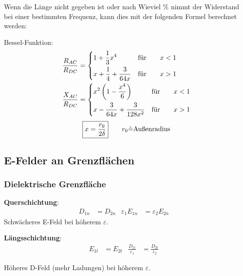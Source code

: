 Wenn die Länge nicht gegeben ist oder nach Wieviel \% nimmt der Widerstand bei
einer bestimmten Frequenz, kann dies mit der folgenden Formel berechnet werden:

\begin{description}
    \item Bessel-Funktion:
        \begin{align*}
            \frac{R_{AC}}{R_{DC}} & =
            \begin{dcases}
                1 + \frac{1}{3}x^4              & \text{für} \qquad x < 1 \\
                x + \frac{1}{4} + \frac{3}{64x} & \text{für} \qquad x > 1 \\
            \end{dcases} \\
            \frac{X_{AC}}{R_{DC}} & =
            \begin{dcases}
                x^2\left( 1-\frac{x^4}{6} \right)   & \text{für} \qquad x < 1 \\
                x- \frac{3}{64x} + \frac{3}{128x^2} & \text{für} \qquad x > 1 \\
            \end{dcases}
        \end{align*}
        \[
            \boxed{x=\frac{r_0}{2\delta}} \qquad r_0 \hat{=} \textnormal{Außenradius}
        \]
\end{description}


\subsection{E-Felder an Grenzflächen}
\subsubsection{Dielektrische Grenzfläche}
\textbf{Querschichtung}:
\begin{align*}
	D_{1n} & = D_{2n} & \varepsilon_1 E_{1n} & =\varepsilon_2 E_{2n} &
\end{align*}
Schwächeres E-Feld bei höherem $ \varepsilon $.

\vspace{0.5em}
\textbf{Längsschichtung}:
\begin{align*}
	E_{1t} & = E_{2t} & \frac{D_{1t}}{\varepsilon_1} & = \frac{D_{2t}}{\varepsilon_2} &
\end{align*}

Höheres D-Feld (mehr Ladungen) bei höherem $ \varepsilon $.

